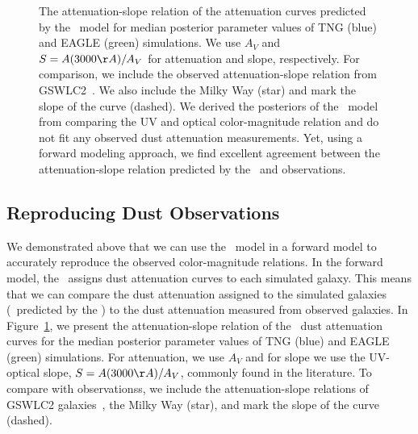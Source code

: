 \begin{figure}
\begin{center}
    \caption{\label{fig:slope}
    The attenuation-slope relation of the attenuation curves predicted by the
    \eda~model for median posterior parameter values of TNG (blue) and EAGLE
    (green) simulations. We use $A_V$ and $S = A(3000\AA)/A_V$ for attenuation
    and slope, respectively. For comparison, we include the observed 
    attenuation-slope relation from GSWLC2~\citep{salim2020}. We also include 
    the Milky Way (star) and mark the slope of the \cite{calzetti2001} curve
    (dashed). We derived the posteriors of the \eda~model from comparing the
    UV and optical color-magnitude relation and do not fit any observed dust
    attenuation measurements. Yet, using a forward modeling approach, we find 
    excellent agreement between the  attenuation-slope relation predicted by
    the \eda~and observations. 
    }
\end{center}
\end{figure}

\subsection{Reproducing Dust Observations} 
We demonstrated above that we can use the \eda~model in a forward model to
accurately reproduce the observed color-magnitude relations. In the forward
model, the \eda~assigns dust attenuation curves to each simulated galaxy. This
means that we can compare the dust attenuation assigned to the simulated
galaxies (\ie~predicted by the \eda) to the dust attenuation measured from 
observed galaxies. In Figure~\ref{fig:slope}, we present the attenuation-slope 
relation of the \eda~dust attenuation curves for the median posterior parameter 
values of TNG (blue) and EAGLE (green) simulations. For attenuation, we use
$A_V$ and for slope we use the UV-optical slope, $S = A(3000\AA)/A_V$, commonly
found in the literature. To compare with observationss, we include the 
attenuation-slope relations of GSWLC2 galaxies~\citep[grey;][]{salim2020}, the
Milky Way (star), and mark the slope of the \cite{calzetti2001} curve (dashed). 

